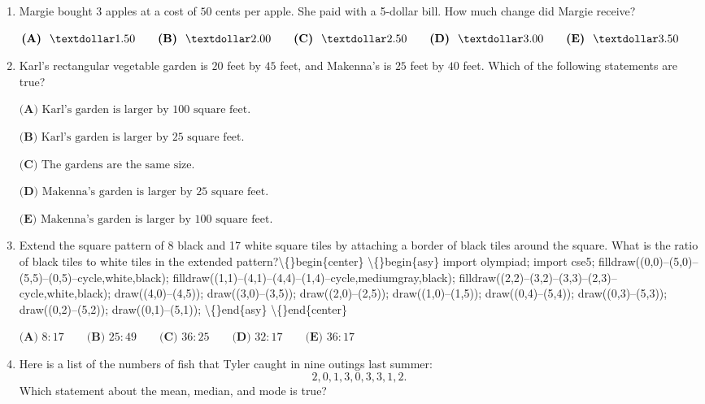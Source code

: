 \documentclass{article}
\begin{document}
\begin{enumerate}[label=\arabic*., itemsep=0.5em]\item Margie bought \( 3 \) apples at a cost of \( 50 \) cents per apple. She paid with a 5-dollar bill. How much change did Margie receive?

\(\textbf{(A) }\ \textdollar 1.50 \qquad \textbf{(B) }\ \textdollar 2.00 \qquad \textbf{(C) }\ \textdollar 2.50 \qquad \textbf{(D) }\ \textdollar 3.00 \qquad \textbf{(E) }\ \textdollar 3.50\)\par \vspace{0.5em}\item Karl's rectangular vegetable garden is \( 20 \) feet by \( 45 \) feet, and Makenna's is \( 25 \) feet by \( 40 \) feet. Which of the following statements are true?

\(\textbf{(A) }\text{Karl's garden is larger by 100 square feet.}\)

\(\textbf{(B) }\text{Karl's garden is larger by 25 square feet.}\)
 
\(\textbf{(C) }\text{The gardens are the same size.}\) 

\(\textbf{(D) }\text{Makenna's garden is larger by 25 square feet.}\)

\(\textbf{(E) }\text{Makenna's garden is larger by 100 square feet.}\)\par \vspace{0.5em}\item Extend the square pattern of 8 black and 17 white square tiles by attaching a border of black tiles around the square. What is the ratio of black tiles to white tiles in the extended pattern?\textbackslash\{\}begin\{center\}
\textbackslash\{\}begin\{asy\}
import olympiad;
import cse5;
filldraw((0,0)--(5,0)--(5,5)--(0,5)--cycle,white,black);
filldraw((1,1)--(4,1)--(4,4)--(1,4)--cycle,mediumgray,black);
filldraw((2,2)--(3,2)--(3,3)--(2,3)--cycle,white,black);
draw((4,0)--(4,5));
draw((3,0)--(3,5));
draw((2,0)--(2,5));
draw((1,0)--(1,5));
draw((0,4)--(5,4));
draw((0,3)--(5,3));
draw((0,2)--(5,2));
draw((0,1)--(5,1));
\textbackslash\{\}end\{asy\}
\textbackslash\{\}end\{center\}


\( \textbf{(A) }8:17 \qquad\textbf{(B) }25:49 \qquad\textbf{(C) }36:25 \qquad\textbf{(D) }32:17 \qquad\textbf{(E) }36:17\)\par \vspace{0.5em}\item Here is a list of the numbers of fish that Tyler caught in nine outings last summer: 
\begin{equation*}
2,0,1,3,0,3,3,1,2.
\end{equation*}
 Which statement about the mean, median, and mode is true?


\end{enumerate}
\end{document}
